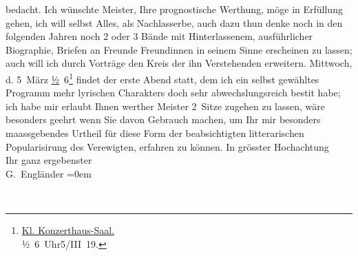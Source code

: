 \begin{ledgroupsized}[t]{13cm}
               bedacht.\pend
           \pstart
           Ich wünschte Meister, Ihre prognostische Werthung, möge in Erfüllung gehen, ich will
               selbst Alles, als Nachlasserbe, auch dazu thun {\kaufmannsund} denke
               noch in den folgenden Jahren noch 2 oder 3 {\pb}Bände mit
               Hinterlassenem, ausführlicher Biographie, Briefen an Freunde {\kaufmannsund} Freundinnen in seinem Sinne erscheinen zu lassen; auch
               will ich durch Vorträge den Kreis der ihn Verstehenden erweitern.\pend
           \pstart
           Mittwoch, d. 5 März{ }\uline{½} 6\footnote{\noindent{}\uline{Kl. Konzerthaus-Saal.}{\\}½ 6 Uhr\hspace*{1em}5/III 19.} findet der erste Abend statt, dem ich ein selbst gewähltes Programm mehr
               lyrischen Charakters {\kaufmannsund} doch sehr abwechslungsreich
                  besti{\geminationm}t habe; ich habe mir erlaubt Ihnen werther
               Meister 2 Sitze zugehen zu lassen, wäre besonders geehrt wenn Sie davon Gebrauch
               machen, um Ihr mir besonders maassgebendes Urtheil für diese Form der beabsichtigten
               litterarischen Popularisirung des Verewigten, erfahren zu können.\pend
           \pstart
           In grösster Hochachtung{\\[\baselineskip]}Ihr ganz ergebenster{\\[\baselineskip]}\spacefill\mbox{G. Engländer}\pend
           \leftskip=0em{}
         
         \endnumbering{}\end{ledgroupsized}  \newcommand{\dateiname}{L02321}\newcommand{\titel}{Georg Engländer an Arthur Schnitzler, 27. 2. 1919}\newcommand{\editorInnen}{Martin Anton Müller und Gerd-Hermann Susen}
      
